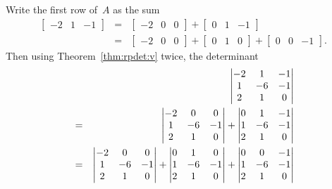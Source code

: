 \begin{example}
\begin{solution} 
Write the first row of~\(A\) as the sum 
\begin{eqnarray*}
\begin{bmatrix}-2&1&-1\end{bmatrix} &=&\begin{bmatrix}-2&0&0\end{bmatrix}+\begin{bmatrix}0&1&-1\end{bmatrix} \\&=&\begin{bmatrix}-2&0&0\end{bmatrix}+\begin{bmatrix}0&1&0\end{bmatrix}+\begin{bmatrix}0&0&-1\end{bmatrix}.
\end{eqnarray*}
Then using Theorem~\ref{thm:rpdet:v} twice, the determinant
\begin{eqnarray*}&&\hspace{-1em}
\begin{vmatrix}   -2&1&-1
\\   1 & -6 & -1
\\   2 &  1 & 0
\end{vmatrix}
\\&=&\begin{vmatrix}   -2&0&0
\\   1 & -6 & -1
\\   2 &  1 & 0
\end{vmatrix}
+\begin{vmatrix}   0&1&-1
\\   1 & -6 & -1
\\   2 &  1 & 0
\end{vmatrix}
\\&=&\begin{vmatrix}   -2&0&0
\\   1 & -6 & -1
\\   2 &  1 & 0
\end{vmatrix}
+\begin{vmatrix}   0&1&0
\\   1 & -6 & -1
\\   2 &  1 & 0
\end{vmatrix}
+\begin{vmatrix}   0&0&-1
\\   1 & -6 & -1
\\   2 &  1 & 0
\end{vmatrix}

\end{eqnarray*}
\end{solution}
\end{example}
